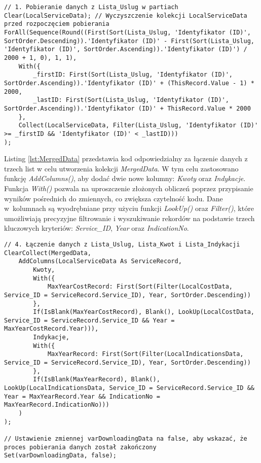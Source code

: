 \begin{lstlisting}[language=PowerFx]
// 1. Pobieranie danych z Lista_Uslug w partiach
Clear(LocalServiceData); // Wyczyszczenie kolekcji LocalServiceData przed rozpoczęciem pobierania
ForAll(Sequence(Round((First(Sort(Lista_Uslug, 'Identyfikator (ID)', SortOrder.Descending)).'Identyfikator (ID)' - First(Sort(Lista_Uslug, 'Identyfikator (ID)', SortOrder.Ascending)).'Identyfikator (ID)') / 2000 + 1, 0), 1, 1),
    With({
        _firstID: First(Sort(Lista_Uslug, 'Identyfikator (ID)', SortOrder.Ascending)).'Identyfikator (ID)' + (ThisRecord.Value - 1) * 2000,
        _lastID: First(Sort(Lista_Uslug, 'Identyfikator (ID)', SortOrder.Ascending)).'Identyfikator (ID)' + ThisRecord.Value * 2000
    },
    Collect(LocalServiceData, Filter(Lista_Uslug, 'Identyfikator (ID)' >= _firstID && 'Identyfikator (ID)' < _lastID)))
);
\end{lstlisting}

Listing \ref{lst:MergedData} przedstawia kod odpowiedzialny za łączenie danych z trzech list w celu utworzenia kolekcji \emph{MergedData}. W tym celu zastosowano funkcję \emph{AddColumns()}, aby dodać dwie nowe kolumny: \emph{Kwoty} oraz \emph{Indykacje}. Funkcja \emph{With()} pozwala na uproszczenie złożonych obliczeń poprzez przypisanie wyników pośrednich do zmiennych, co zwiększa czytelność kodu. Dane w~kolumnach są wyodrębniane przy użyciu funkcji \emph{LookUp()} oraz \emph{Filter()}, które umożliwiają precyzyjne filtrowanie i wyszukiwanie rekordów na podstawie trzech kluczowych kryteriów: \emph{Service\_ID}, \emph{Year} oraz \emph{IndicationNo}.


\begin{lstlisting}[language=PowerFx]
// 4. Łączenie danych z Lista_Uslug, Lista_Kwot i Lista_Indykacji
ClearCollect(MergedData,
    AddColumns(LocalServiceData As ServiceRecord,
        Kwoty,
        With({
            MaxYearCostRecord: First(Sort(Filter(LocalCostData, Service_ID = ServiceRecord.Service_ID), Year, SortOrder.Descending))
        },
        If(IsBlank(MaxYearCostRecord), Blank(), LookUp(LocalCostData, Service_ID = ServiceRecord.Service_ID && Year = MaxYearCostRecord.Year))),
        Indykacje,
        With({
            MaxYearRecord: First(Sort(Filter(LocalIndicationsData, Service_ID = ServiceRecord.Service_ID), Year, SortOrder.Descending))
        },
        If(IsBlank(MaxYearRecord), Blank(), LookUp(LocalIndicationsData, Service_ID = ServiceRecord.Service_ID && Year = MaxYearRecord.Year && IndicationNo = MaxYearRecord.IndicationNo)))
    )
);

// Ustawienie zmiennej varDownloadingData na false, aby wskazać, że proces pobierania danych został zakończony
Set(varDownloadingData, false);
\end{lstlisting}

